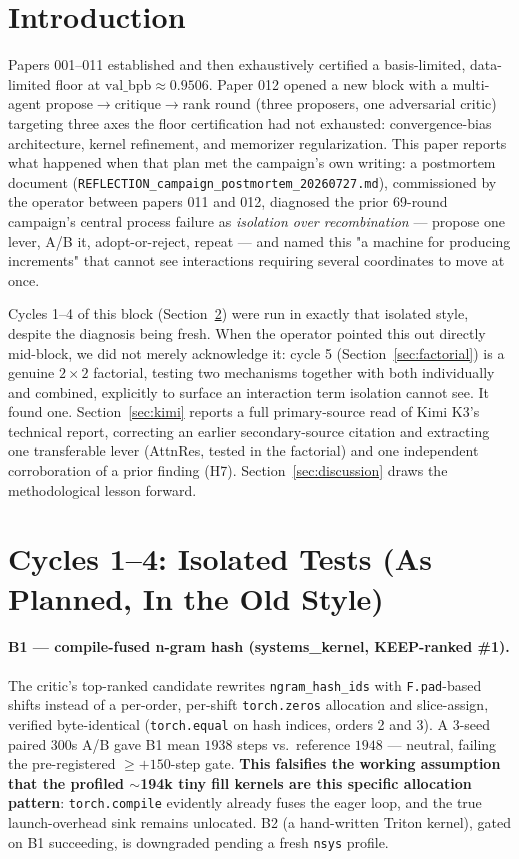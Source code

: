 \documentclass{article}
\newcommand{\valbpb}{\mathrm{val\_bpb}}
\begin{document}
\section{Introduction}
Papers 001--011 established and then exhaustively certified a basis-limited, data-limited floor at $\valbpb \approx 0.9506$. Paper 012 opened a new block with a multi-agent propose$\to$critique$\to$rank round (three proposers, one adversarial critic) targeting three axes the floor certification had not exhausted: convergence-bias architecture, kernel refinement, and memorizer regularization. This paper reports what happened when that plan met the campaign's own writing: a postmortem document (\texttt{REFLECTION\_campaign\_postmortem\_20260727.md}), commissioned by the operator between papers 011 and 012, diagnosed the prior 69-round campaign's central process failure as \emph{isolation over recombination} --- propose one lever, A/B it, adopt-or-reject, repeat --- and named this "a machine for producing increments" that cannot see interactions requiring several coordinates to move at once.

Cycles 1--4 of this block (Section~\ref{sec:cycles}) were run in exactly that isolated style, despite the diagnosis being fresh. When the operator pointed this out directly mid-block, we did not merely acknowledge it: cycle 5 (Section~\ref{sec:factorial}) is a genuine $2\times2$ factorial, testing two mechanisms together with both individually and combined, explicitly to surface an interaction term isolation cannot see. It found one. Section~\ref{sec:kimi} reports a full primary-source read of Kimi K3's technical report, correcting an earlier secondary-source citation and extracting one transferable lever (AttnRes, tested in the factorial) and one independent corroboration of a prior finding (H7). Section~\ref{sec:discussion} draws the methodological lesson forward.

\section{Cycles 1--4: Isolated Tests (As Planned, In the Old Style)}
\label{sec:cycles}

\paragraph{B1 --- compile-fused n-gram hash (systems\_kernel, KEEP-ranked \#1).} The critic's top-ranked candidate rewrites \texttt{ngram\_hash\_ids} with \texttt{F.pad}-based shifts instead of a per-order, per-shift \texttt{torch.zeros} allocation and slice-assign, verified byte-identical (\texttt{torch.equal} on hash indices, orders 2 and 3). A 3-seed paired 300s A/B gave B1 mean $1938$ steps vs.\ reference $1948$ --- neutral, failing the pre-registered $\geq{+}150$-step gate. \textbf{This falsifies the working assumption that the profiled $\sim$194k tiny fill kernels are this specific allocation pattern}: \texttt{torch.compile} evidently already fuses the eager loop, and the true launch-overhead sink remains unlocated. B2 (a hand-written Triton kernel), gated on B1 succeeding, is downgraded pending a fresh \texttt{nsys} profile.
\end{document}
